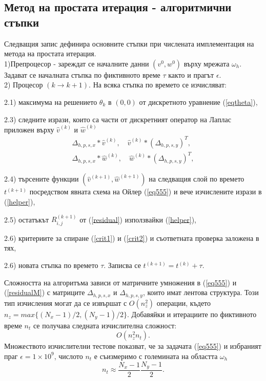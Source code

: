 \documentclass{article}
\newcommand{\be}{\begin{equation}}
\newcommand{\ee}{\end{equation}}
\newcommand{\rf}[1]{(\ref{#1})}
\begin{document}
\subsection{Метод на простата итерация - алгоритмични стъпки}
Следващия запис дефинира основните стъпки при числената имплементация на метода на простата итерация.
\\
1)Препроцесор - зареждат се началните данни $(v^0, w^0)$ върху мрежата $\omega_h$.  Задават се началната стъпка по фиктивното време $\tau$ както и прагът $\epsilon$.
\\
2) Процесор $(k \rightarrow k+1)$. На всяка стъпка по времето се изчисляват: 
\par
2.1) максимума на решението $\theta_k$ в $(0,0)$  от дискретното уравнение \rf{eqtheta},
\par
2.3) следните изрази, които са части от дискретният оператор на Лаплас приложен върху $\widehat{v}^{(k)}$ и $\widehat{w}^{(k)}$
\begin{align}\label{helper}
\Delta_{h,p,s,x} * \widehat{v}^{(k)}, \quad \widehat{v}^{(k)} * (\Delta_{h,p,s,y})^T, \nonumber\\
\Delta_{h,p,s,x} * \widehat{w}^{(k)},\quad  \widehat{w}^{(k)} * (\Delta_{h,p,s,y})^T,
\end{align}
\par
2.4) търсените функции $(\widehat{v}^{(k+1)}, \widehat{w}^{(k+1)})$  на следващия слой по времето $t^{(k+1)}$ посредством явната схема на Ойлер \rf{eq555} и вече изчислените изрази в \rf{helper},
\par
2.5) остатъкът $R^{(k+1)}_{i,j}$ от \rf{residual} използвайки \rf{helper},
\par
2.6) критериите за спиране  \rf{crit1} и \rf{crit2} и съответната проверка заложена в тях,
\par
2.6) новата стъпка по времето $\tau$. Записва се $t^{(k+1)}=t^{(k)}+\tau$.

Сложността на алгоритъма зависи от матричните умножения в \rf{eq555} и \rf{residualM} с матриците $\Delta_{h,p,s,x}$ и $\Delta_{h,p,s,y}$, които имат лентова структура. Този тип изчисления могат да се извършат с $O(n_z^2)$ операции, където $n_z = max\{(N_x-1)/2, (N_y-1)/2\}$.  Добавяйки и итерациите по фиктивното време $n_t$ се получава следната изчислителна сложност:
\be\label{complexElpt}
O(n_z^2 n_t).
\ee
Множеството изчислителни тестове показват, че за задачата \rf{eq555} и избраният праг $\epsilon = 1 \times 10^9$, числото $n_t$ е съизмеримо с големината на областта $\omega_h$
\be
n_t \approx \frac{N_x-1}{2} \frac{N_y-1}{2}.
\ee
\end{document}
